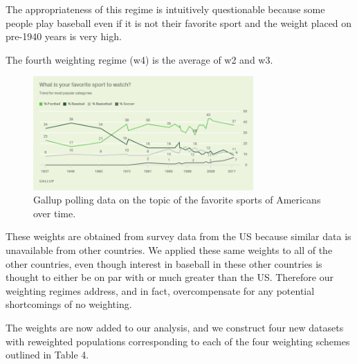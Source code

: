 \documentclass[11pt]{article}\usepackage[]{graphicx}\usepackage[]{color}
\begin{document}
The appropriateness of this regime is intuitively questionable because 
some people play baseball even if it is not their favorite sport and the 
weight placed on pre-1940 years is very high.  

The fourth weighting regime (w4) is the average of w2 and w3.  



\begin{figure}
\begin{center}
\includegraphics[width=0.75\textwidth]{Gallupfavoritesport.png}
\end{center}
\caption{Gallup polling data on the topic of the favorite sports 
  of Americans over time.}
\label{Gallup}
\end{figure}


These weights are obtained from survey data from the US because similar data 
is unavailable from other countries.
We applied these same 
weights to all of the other countries, even though interest in baseball in 
these other countries is thought to either be on par with or much greater 
than the US.  Therefore our weighting regimes address, and in fact, 
overcompensate for any potential shortcomings of no weighting.

The weights are now added to our analysis, and we construct four new datasets 
with reweighted populations corresponding to each of the four weighting 
schemes outlined in Table 4.
\end{document}
